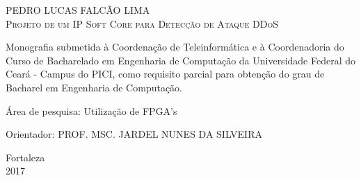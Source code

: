 \begin{titlepage}
\vfill
\begin{center}

    {\large PEDRO LUCAS FALCÃO LIMA\\}
    \vspace{2cm}
    {\Large \textsc{Projeto de um IP Soft Core para Detecção de Ataque DDoS}\\}
    \vspace{1cm}
    \hspace{.45\linewidth}
    \begin{minipage}{.50\linewidth}

            Monografia submetida à Coordenação de Teleinformática e à Coordenadoria do Curso de Bacharelado 
            em Engenharia de Computação da Universidade Federal do Ceará - Campus do PICI, como requisito 
            parcial para obtenção do grau de Bacharel em Engenharia de Computação.

            \vspace{0.5 cm}

            Área de pesquisa: Utilização de FPGA's 

            \vspace{0.5 cm}

            Orientador: PROF. MSC. JARDEL NUNES DA SILVEIRA
    
    \end{minipage}

    \vspace{2cm}
    \vfill
    {\large Fortaleza\\ 2017}
\end{center}

\end{titlepage}